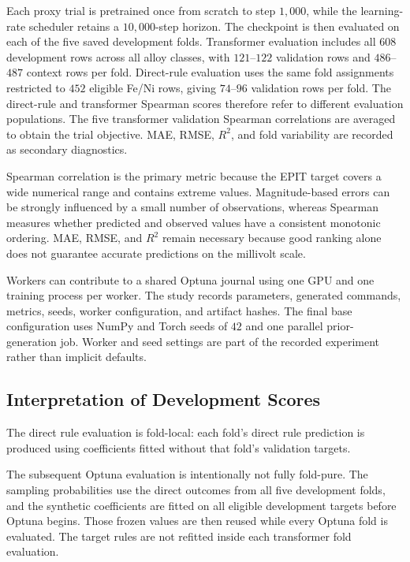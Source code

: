 \documentclass{article}
\begin{document}
Each proxy trial is pretrained once from scratch to step \(1{,}000\), while
the learning-rate scheduler retains a \(10{,}000\)-step horizon. The checkpoint
is then evaluated on each of the five saved development folds. Transformer
evaluation includes all \(608\) development rows across all alloy classes,
with \(121\)--\(122\) validation rows and \(486\)--\(487\) context rows per
fold. Direct-rule evaluation uses the same fold assignments restricted to
\(452\) eligible Fe/Ni rows, giving \(74\)--\(96\) validation rows per fold.
The direct-rule and transformer Spearman scores therefore refer to different
evaluation populations. The five transformer validation Spearman
correlations are averaged to obtain the trial objective. MAE, RMSE, \(R^2\),
and fold variability are recorded as secondary diagnostics.

Spearman correlation is the primary metric because the EPIT target covers a
wide numerical range and contains extreme values. Magnitude-based errors can
be strongly influenced by a small number of observations, whereas Spearman
measures whether predicted and observed values have a consistent monotonic
ordering. MAE, RMSE, and \(R^2\) remain necessary because good ranking alone
does not guarantee accurate predictions on the millivolt scale.

Workers can contribute to a shared Optuna journal using one GPU and one
training process per worker. The study records parameters, generated commands,
metrics, seeds, worker configuration, and artifact hashes. The final base
configuration uses NumPy and Torch seeds of \(42\) and one parallel
prior-generation job. Worker and seed settings are part of the recorded
experiment rather than implicit defaults.

\subsection{Interpretation of Development Scores}

The direct rule evaluation is fold-local: each fold's direct rule prediction
is produced using coefficients fitted without that fold's validation targets.

The subsequent Optuna evaluation is intentionally not fully fold-pure. The
sampling probabilities use the direct outcomes from all five development
folds, and the synthetic coefficients are fitted on all eligible development
targets before Optuna begins. Those frozen values are then reused while
every Optuna fold is evaluated. The target rules are not refitted inside each
transformer fold evaluation.
\end{document}
